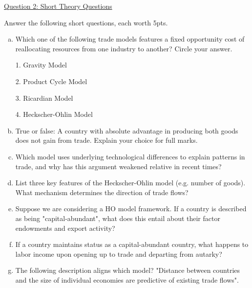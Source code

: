 \documentclass[12pt]{article}
\begin{document}
\newpage

\noindent \underline{Question 2: Short Theory Questions}

\noindent Answer the following short questions, each worth 5pts.
\begin{enumerate}[a)]
	\item Which one of the following trade models features a fixed opportunity cost of reallocating resources from one industry to another? Circle your answer.
	
	1. Gravity Model
	
	2. Product Cycle Model
	
	3. Ricardian Model
	
	4. Heckscher-Ohlin Model
	
	\bigskip
	
	\item True or false: A country with absolute advantage in producing both goods does not gain from trade.
	Explain your choice for full marks. 
	
	\vspace{2in}
	
	\item Which model uses underlying technological differences to explain patterns in trade, and why has this argument weakened relative in recent times?
	
	\vspace{2in}
	
	
	\newpage
	
	\item List three key features of the Heckscher-Ohlin model (e.g. number of goods). What mechanism determines the direction of trade flows?
	
	\vspace{2.5in}
	
	
	\item Suppose we are considering a HO model framework. If a country is described as being "capital-abundant", what does this entail about their factor endowments and export activity?
	
	\vspace{1.8in}
	
	\item If a country maintains status as a capital-abundant country, what happens to labor income upon opening up to trade and departing from autarky?
	
	\vspace{1.8in}
	
	\newpage
	
	\item The following description aligns which model? "Distance between countries and the size of individual economies are predictive of existing trade flows".
	

\end{enumerate}
\end{document}
